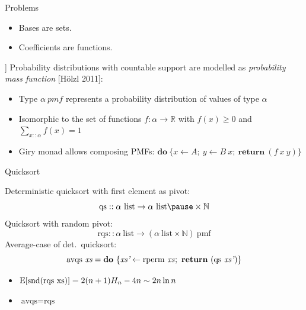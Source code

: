 \documentclass[%
	sans,
	12pt,
]{beamer}
\newcommand{\high}[1]{{\usebeamercolor[fg]{structure} #1}}
\newcommand{\expectation}{\text{\upshape E}}
\begin{document}
\begin{frame}{Problems}
\begin{itemize}
\item Bases are sets.
\item Coefficients are functions.
\end{itemize}]
Probability distributions with countable support are modelled as \emph{probability mass function} [Hölzl 2011]:\pause
\begin{itemize}
\item Type $\alpha\ \textit{pmf}$ represents a probability distribution of values of type $\alpha$\pause
\item Isomorphic to the set of functions $f : \alpha\to\mathbb{R}$ with $f(x) \geq 0$ and $\sum_{x :: \alpha} f(x) = 1$\pause
\item Giry monad allows composing PMFs: $\textbf{do}\ \{x\leftarrow A;\ y \leftarrow B\ x;\ \textbf{return}\ (f\ x\ y)\}$
\end{itemize}
\end{frame}

\begin{frame}
\begin{center}
\huge\high{Quicksort}
\end{center}
\end{frame}

\begin{frame}
Deterministic quicksort with first element as pivot:
\[\text{qs} :: \alpha\ \text{list} \to \alpha\ \text{list}\pause \times \mathbb{N}\]\pause
Quicksort with random pivot:
\[\text{rqs} :: \alpha\ \text{list} \to (\alpha\ \text{list} \times \mathbb{N})\ \text{pmf}\]\pause
Average-case of det.\ quicksort:
\[\text{avqs}\ \textit{xs} = \textbf{do}\ \{\textit{xs'} \leftarrow \text{rperm}\ \textit{xs}\hskip0.2mm;\ \textbf{return}\ (\text{qs}\ \textit{xs'}\hskip0.2mm)\}\]\pause
\vspace*{-1.5em}
\begin{theorem}
\upshape
\begin{itemize}
\item $\expectation[\text{snd}(\text{rqs}\ \text{xs})] = 2(n+1) H_n - 4n \sim 2 n \ln n$\pause
\item $\text{avqs} = \text{rqs}$
\end{itemize}
\end{theorem}
\end{frame}
\end{document}
